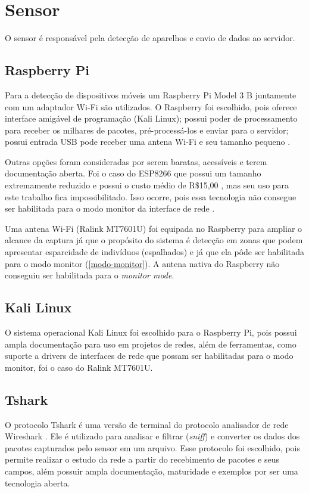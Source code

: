 \section{Sensor}
O sensor é responsável pela detecção de aparelhos e envio de dados ao servidor.

\subsection{Raspberry Pi}
Para a detecção de dispositivos móveis um Raspberry Pi Model 3 B juntamente com um adaptador Wi-Fi são utilizados. O Raspberry foi escolhido,
pois oferece interface amigável de programação (Kali Linux); possui poder de processamento para receber os milhares de pacotes, pré-processá-los
e enviar para o servidor; possui entrada USB pode receber uma antena Wi-Fi e seu tamanho pequeno \cite{rpi2017}.

Outras opções foram consideradas por serem baratas, acessíveis e terem documentação aberta. Foi o caso do ESP8266 que possui um tamanho extremamente
reduzido e possui o custo médio de R\$15,00 \cite{Embarcados2015}, mas seu uso para este trabalho fica impossibilitado. Isso
ocorre, pois essa tecnologia não consegue ser habilitada para o modo monitor da interface de rede \cite{Puhl2016} \cite{Ferreira2016}.

Uma antena Wi-Fi (Ralink MT7601U) foi equipada no Raspberry para ampliar o alcance da captura já que o propósito do sistema é detecção em zonas que podem
apresentar esparcidade de indivíduos (espalhados) e já que ela pôde ser habilitada para o modo monitor (\autoref{modo-monitor}). A antena nativa
do Raspberry não conseguiu ser habilitada para o \emph{monitor mode}.

\subsection{Kali Linux}
O sistema operacional Kali Linux \cite{kali} foi escolhido para o Raspberry Pi, pois possui ampla documentação
para uso em projetos de redes, além de ferramentas, como suporte a drivers de interfaces de rede que possam
ser habilitadas para o modo monitor, foi o caso do Ralink MT7601U.

\subsection{Tshark}
O protocolo Tshark é uma versão de terminal do protocolo
analisador de rede Wireshark \cite{Wireshark2017} \cite{Wireshark2017a}. Ele é
utilizado para analisar e filtrar (\emph{sniff}) e converter os dados dos
pacotes capturados pelo sensor em um arquivo. Esse protocolo foi
escolhido, pois permite realizar o estudo da rede a partir do recebimento de
pacotes e seus campos, além possuir ampla documentação, maturidade e exemplos
por ser uma tecnologia aberta.
